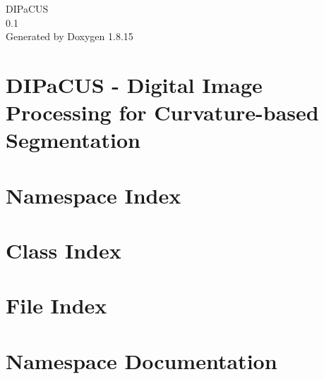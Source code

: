 \documentclass[twoside]{book}
\newcommand{\+}{\discretionary{\mbox{\scriptsize$\hookleftarrow$}}{}{}}
\newcommand{\clearemptydoublepage}{%
  \newpage{\pagestyle{empty}\cleardoublepage}%
}
\begin{document}
\hypersetup{pageanchor=false,
             bookmarksnumbered=true,
             pdfencoding=unicode
            }
\begin{titlepage}
\vspace*{7cm}
\begin{center}%
{\Large D\+I\+Pa\+C\+US \\[1ex]\large 0.\+1 }\\
\vspace*{1cm}
{\large Generated by Doxygen 1.8.15}\\
\end{center}
\end{titlepage}
\clearemptydoublepage
{}
\tableofcontents
\clearemptydoublepage
{}
\hypersetup{pageanchor=true}

\chapter{D\+I\+Pa\+C\+US -\/ Digital Image Processing for Curvature-\/based Segmentation}
\label{index}\hypertarget{index}{}
\chapter{Namespace Index}

\chapter{Class Index}

\chapter{File Index}

\chapter{Namespace Documentation}








\end{document}
